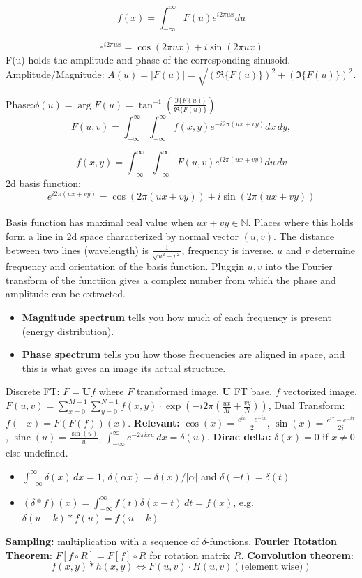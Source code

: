 \documentclass[a4paper,9pt]{article}
\begin{document}
$$f(x) = \int_{-\infty}^{\infty} F(u)e^{i2\pi ux} du$$

$$e^{i2\pi ux} = \cos(2\pi ux) + i\sin(2\pi ux)$$
F(u) holds the amplitude and phase of the corresponding sinusoid.
Amplitude/Magnitude: $A(u) = |F(u)| = \sqrt{(\Re\{F(u)\})^2 + (\Im\{F(u)\})^2}.$

Phase:$\phi(u) = \arg F(u) = \tan^{-1}\left(\frac{\Im\{F(u)\}}{\Re\{F(u)\}}\right)$\\
$$F(u, v) = \int_{-\infty}^{\infty} \int_{-\infty}^{\infty} f(x, y)e^{-i2\pi(ux+vy)} dx\, dy,$$

$$f(x, y) = \int_{-\infty}^{\infty} \int_{-\infty}^{\infty} F(u, v)e^{i2\pi(ux+vy)} du\, dv$$
2d basis function: $$e^{i2\pi(ux+vy)} = \cos(2\pi(ux+vy)) + i\sin(2\pi(ux+vy))$$\\
Basis function has maximal real value when $ux+vy \in \mathbb{N}$. Places where this holds form a line in 2d space characterized by normal vector $(u,v)$.
The distance between two lines (wavelength) is $\frac{1}{\sqrt{u^2+v^2}}$, frequency is inverse.
$u$ and $v$ determine frequency and orientation of the basis function. Pluggin $u,v$ into the Fourier transform of the functiion gives a complex number from which the phase and amplitude can be extracted.
\begin{itemize}
  \item \textbf{Magnitude spectrum} tells you how much of each frequency is present (energy distribution).
  \item \textbf{Phase spectrum} tells you how those frequencies are aligned in space, and this is what gives an image its actual structure.
\end{itemize}
Discrete FT: $F = \mathbf{U} f$ where $F$ transformed image, $\mathbf{U}$ FT base, $f$ vectorized image. $F(u, v) = \sum_{x = 0}^{M - 1} \sum_{y = 0}^{N - 1} f(x, y) \cdot \exp\left(-i 2\pi \left(\frac{u x}{M} + \frac{v y}{N}\right)\right)$, Dual Transform: $f(-x) = F(F(f))(x)$.
\textbf{Relevant:} $\cos(x) = \frac{e^{i x} + e^{-i x}}{2}$, $\sin(x) = \frac{e^{i x} - e^{-i x}}{2i}$, $\operatorname{sinc}(u) = \frac{\sin(u)}{u}$, $\int_{-\infty}^{\infty} e^{-2\pi i x u} \, dx = \delta(u)$.
\textbf{Dirac delta:} $\delta(x) = 0$ if $x \ne 0$ else undefined.
\begin{itemize}
  \item $\int_{-\infty}^{\infty} \delta(x) \, dx = 1$, $\delta(\alpha x) = \delta(x) / |\alpha|$ and $\delta(-t) = \delta(t)$
  \item $(\delta * f)(x) = \int_{-\infty}^{\infty} f(t) \delta(x - t) \, dt = f(x)$, e.g. $\delta(u - k) * f(u) = f(u - k)$
\end{itemize}
\textbf{Sampling:} multiplication with a sequence of $\delta$-functions, \textbf{Fourier Rotation Theorem}: $F[f \circ R] = F[f] \circ R$ for rotation matrix $R$.
\textbf{Convolution theorem}:$$f(x,y) * h(x,y) \iff F(u,v) \cdot H(u,v)(\text{(element wise)})$$
\end{document}

